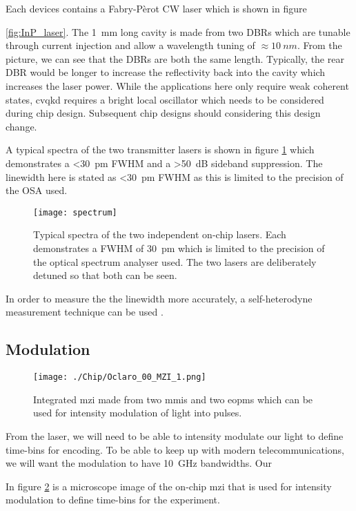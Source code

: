 Each devices contains a Fabry-P\`{e}rot \acl{CW} laser which is shown in figure{\ref{fig:InP_laser}. The \SI{1}{mm} long cavity is made from two \acp{DBR} which are tunable through current injection and allow a wavelength tuning of $\approx \SI{10}{nm}$. From the picture, we can see that the \acp{DBR} are both the same length. Typically, the rear \ac{DBR} would be longer to increase the reflectivity back into the cavity which increases the laser power. While the applications here only require weak coherent states, \ac{cvqkd} requires a bright local oscillator which needs to be considered during chip design. Subsequent chip designs should considering this design change.

A typical spectra of the two transmitter lasers is shown in figure \ref{fig:spectra} which demonstrates a \SI{<30}{pm} \ac{FWHM} and a \SI{>50}{dB} sideband suppression. The linewidth here is stated as \SI{<30}{pm} \ac{FWHM} as this is limited to the precision of the \ac{OSA} used. 

\begin{figure}[tbp]
	\centering
	\texttt{[image: spectrum]}
	\caption[Laser spectrum]{Typical spectra of the two independent on-chip lasers. Each demonstrates a \ac{FWHM} of \SI{30}{pm} which is limited to the precision of the optical spectrum analyser used. The two lasers are deliberately detuned so that both can be seen. }
	\label{fig:spectra}
\end{figure}

In order to measure the the linewidth more accurately, a self-heterodyne measurement technique can be used \cite{}. 

\subsection{Modulation}

\begin{figure}[tbp]
	\texttt{[image: ./Chip/Oclaro\_00\_MZI\_1.png]}
	\caption{Integrated \acl{mzi} made from two \acsp{mmi} and two \acsp{eopm}  which can be used for intensity modulation of light into pulses.}
	\label{fig:InP_MZI}
\end{figure}

From the laser, we will need to be able to intensity modulate our light to define time-bins for encoding. To be able to keep up with modern telecommunications, we will want the modulation to have \SI{10}{GHz} bandwidths. Our

In figure \ref{fig:InP_MZI} is a microscope image of the on-chip \ac{mzi} that is used for intensity modulation to define time-bins for the experiment.

}
